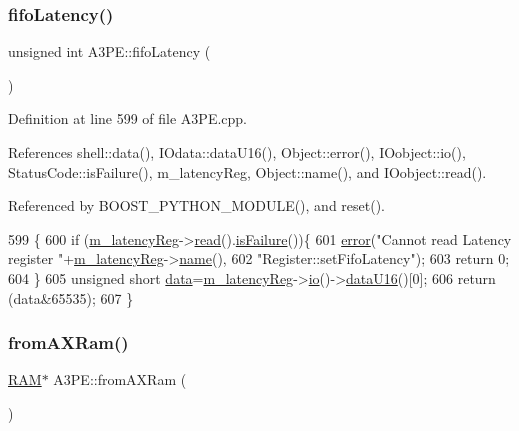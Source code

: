 \subsubsection{\texorpdfstring{fifo\+Latency()}{fifoLatency()}}
{\footnotesize\ttfamily unsigned int A3\+P\+E\+::fifo\+Latency (\begin{DoxyParamCaption}{ }\end{DoxyParamCaption})}



Definition at line 599 of file A3\+P\+E.\+cpp.



References shell\+::data(), I\+Odata\+::data\+U16(), Object\+::error(), I\+Oobject\+::io(), Status\+Code\+::is\+Failure(), m\+\_\+latency\+Reg, Object\+::name(), and I\+Oobject\+::read().



Referenced by B\+O\+O\+S\+T\+\_\+\+P\+Y\+T\+H\+O\+N\+\_\+\+M\+O\+D\+U\+L\+E(), and reset().


\begin{DoxyCode}
599                               \{
600   \textcolor{keywordflow}{if} (\hyperlink{classA3PE_a96a167e73e264da5a18d9ddb5ebb5f23}{m\_latencyReg}->\hyperlink{classIOobject_aa07610c11963b1db6710e3c76ceea456}{read}().\hyperlink{classStatusCode_a5dd22dc6eb2c52fc4cabc58f6dea2eb7}{isFailure}())\{
601     \hyperlink{classObject_a204a95f57818c0f811933917a30eff45}{error}(\textcolor{stringliteral}{"Cannot read Latency register "}+\hyperlink{classA3PE_a96a167e73e264da5a18d9ddb5ebb5f23}{m\_latencyReg}->\hyperlink{classObject_a300f4c05dd468c7bb8b3c968868443c1}{name}(),
602         \textcolor{stringliteral}{"Register::setFifoLatency"});
603     \textcolor{keywordflow}{return} 0;
604   \}
605   \textcolor{keywordtype}{unsigned} \textcolor{keywordtype}{short} \hyperlink{namespaceshell_a5ea2525995cedc3efd69ea8a7f034d1e}{data}=\hyperlink{classA3PE_a96a167e73e264da5a18d9ddb5ebb5f23}{m\_latencyReg}->\hyperlink{classIOobject_af04fb94137c3d86849f478ac5afab5d1}{io}()->\hyperlink{classIOdata_a8d8528b731c6cf117f8c5b9b2473390c}{dataU16}()[0];
606   \textcolor{keywordflow}{return} (data&65535);   
607 \}
\end{DoxyCode}
\mbox{\label{classA3PE_a7c9026a74c1954b2d250be05fbc1c8c5}} 
\subsubsection{\texorpdfstring{from\+A\+X\+Ram()}{fromAXRam()}}
{\footnotesize\ttfamily \hyperlink{classRAM}{R\+AM}$\ast$ A3\+P\+E\+::from\+A\+X\+Ram (\begin{DoxyParamCaption}{ }\end{DoxyParamCaption})\hspace{0.3cm}{\ttfamily [inline]}}



